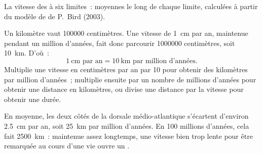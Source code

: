 \begin{omfigure}

{\small La vitesse des  à six limites~: moyennes le long de chaque
limite, calculées à partir du modèle de  de P.~Bird (2003).}
\end{omfigure}

\begin{method}\label{met:g7:plate-tectonics:convert}
Un kilomètre vaut \num{100000} centimètres. Une vitesse de \qty{1}{cm} par
an, maintenue pendant un million d'années, fait donc parcourir
\num{1000000} centimètres, soit \qty{10}{km}. D'où~:
\[
  1\ \text{cm par an} = 10\ \text{km par million d'années}.
\]
Multiplie une vitesse en centimètres par an par 10 pour obtenir des
kilomètres par million d'années~; multiplie ensuite par un nombre de
millions d'années pour obtenir une distance en kilomètres, ou divise une
distance par la vitesse pour obtenir une durée.
\end{method}

\begin{example}\label{ex:g7:plate-tectonics:atlantic}
En moyenne, les deux côtés de la dorsale médio-atlantique s'écartent
d'environ \qty{2.5}{cm} par an, soit \qty{25}{km} par million d'années. En
100 millions d'années, cela fait \qty{2500}{km}~: maintenue assez
longtemps, une vitesse bien trop lente pour être remarquée au cours d'une
vie ouvre un .
\end{example}

